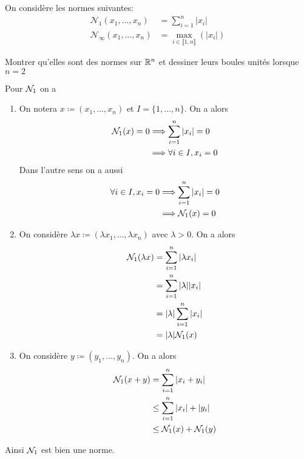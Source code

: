 \documentclass[french,a4paper,10pt]{article}
\begin{document}
	\medspace
	\begin{td-exo}
		On considère les normes suivantes:
		\[\begin{aligned}
			\mathcal{N}_1(x_1, \dots,x_n)&=\sum_{i=1}^n|x_i|\\
			\mathcal{N}_\infty(x_1, \dots, x_n)&=\max_{i\in\llbracket1,n\rrbracket}(|x_i|)
		\end{aligned}\]
		
		Montrer qu'elles sont des normes sur $\mathbb{R}^n$ et dessiner leurs boules unités lorsque $n=2$
	\end{td-exo}
	\begin{td-sol}
		Pour $\mathcal{N}_1$ on a
		\begin{enumerate}[label=$(\roman*)$]
			\item On notera $x\coloneq(x_1,\dots,x_n)$ et $I=\{1,\dots,n\}$. On a alors
				\[\begin{aligned}
					\mathcal{N}_1(x)=0&\Longrightarrow\sum_{i=1}^n|x_i| = 0\\
					&\Longrightarrow\forall i\in I,x_i=0
				\end{aligned}\] 
				Dans l'autre sens on a aussi
				\[\begin{aligned}
					\forall i\in I,x_i=0&\Longrightarrow \sum_{i=1}^n|x_i| = 0\\
					&\Longrightarrow\mathcal{N}_1(x)=0
				\end{aligned}\] 
			\item On considère $\lambda x \coloneq(\lambda x_1,\dots,\lambda x_n)$ avec $\lambda>0$. On a alors
				\[\begin{aligned}
					\mathcal{N}_1 (\lambda x)&=\sum_{i=1}^n|\lambda x_i|\\
					&=\sum_{i=1}^n|\lambda| |x_i|\\
					&=|\lambda| \sum_{i=1}^n|x_i|\\
					&=|\lambda| \mathcal{N}_1 (x)
				\end{aligned}\]
			\item On considère $y\coloneq(y_1,\dots,y_n)$. On a alors
				\[\begin{aligned}
					\mathcal{N}_1 (x+y)&=\sum_{i=1}^n|x_i+y_i|\\
					&\le \sum_{i=1}^n|x_i|+|y_i|\\
					&\le \mathcal{N}_1 (x)+\mathcal{N}_1(y)
				\end{aligned}\]
		\end{enumerate}
		Ainsi $\mathcal{N}_1$ est bien une norme.
		

\end{td-sol}
\end{document}

